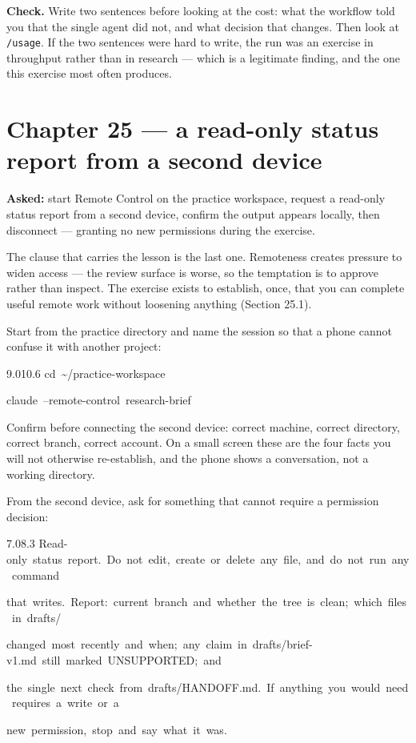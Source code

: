 \documentclass[11pt,a4paper,twoside,openany]{book}
\newcommand{\cl}[1]{\noindent\mbox{#1}\par}
\begin{document}
\textbf{Check.} Write two sentences before looking at the cost: what the workflow told you that the single agent did not, and what decision that changes. Then look at \texttt{/\allowbreak{}usage}. If the two sentences were hard to write, the run was an exercise in throughput rather than in research — which is a legitimate finding, and the one this exercise most often produces.


\FloatBarrier
\section*{Chapter 25 — a read-only status report from a second device}

\textbf{Asked:} start Remote Control on the practice workspace, request a read-only status report from a second device, confirm the output appears locally, then disconnect — granting no new permissions during the exercise.


The clause that carries the lesson is the last one. Remoteness creates pressure to widen access — the review surface is worse, so the temptation is to approve rather than inspect. The exercise exists to establish, once, that you can complete useful remote work without loosening anything (Section 25.1).


Start from the practice directory and name the session so that a phone cannot confuse it with another project:


\begin{codeblock}{9.0}{10.6}
\cl{cd~\textasciitilde{}/practice-workspace}
\cl{claude~--remote-control~research-brief}
\end{codeblock}

Confirm before connecting the second device: correct machine, correct directory, correct branch, correct account. On a small screen these are the four facts you will not otherwise re-establish, and the phone shows a conversation, not a working directory.


From the second device, ask for something that cannot require a permission decision:


\begin{codeblock}{7.0}{8.3}
\cl{Read-only~status~report.~Do~not~edit,~create~or~delete~any~file,~and~do~not~run~any~command}
\cl{that~writes.~Report:~current~branch~and~whether~the~tree~is~clean;~which~files~in~drafts/}
\cl{changed~most~recently~and~when;~any~claim~in~drafts/brief-v1.md~still~marked~UNSUPPORTED;~and}
\cl{the~single~next~check~from~drafts/HANDOFF.md.~If~anything~you~would~need~requires~a~write~or~a}
\cl{new~permission,~stop~and~say~what~it~was.}
\end{codeblock}
\end{document}
